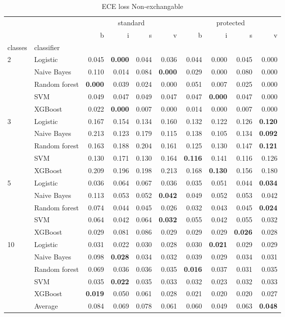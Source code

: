 \begin{table}
\caption{ECE loss Non-exchangable}
\begin{tabular}{l|l|rrrr|rrrr}
\toprule
 &  & \multicolumn{4}{c}{standard} & \multicolumn{4}{c}{protected} \\
 &  & b & i & s & v & b & i & s & v \\
classes & classifier &  &  &  &  &  &  &  &  \\
\midrule
\midrule
\multirow[c]{5}{*}{2} & Logistic & 0.045 & \textbf{0.000} & 0.044 & 0.036 & 0.044 & 0.000 & 0.045 & 0.000 \\
 & Naive Bayes & 0.110 & 0.014 & 0.084 & \textbf{0.000} & 0.029 & 0.000 & 0.080 & 0.000 \\
 & Random forest & \textbf{0.000} & 0.039 & 0.024 & 0.000 & 0.051 & 0.007 & 0.025 & 0.000 \\
 & SVM & 0.049 & 0.047 & 0.049 & 0.047 & 0.047 & \textbf{0.000} & 0.047 & 0.000 \\
 & XGBoost & 0.022 & \textbf{0.000} & 0.007 & 0.000 & 0.014 & 0.000 & 0.007 & 0.000 \\
\midrule
\multirow[c]{5}{*}{3} & Logistic & 0.167 & 0.154 & 0.134 & 0.160 & 0.132 & 0.122 & 0.126 & \textbf{0.120} \\
 & Naive Bayes & 0.213 & 0.123 & 0.179 & 0.115 & 0.138 & 0.105 & 0.134 & \textbf{0.092} \\
 & Random forest & 0.163 & 0.188 & 0.204 & 0.161 & 0.125 & 0.130 & 0.147 & \textbf{0.121} \\
 & SVM & 0.130 & 0.171 & 0.130 & 0.164 & \textbf{0.116} & 0.141 & 0.116 & 0.126 \\
 & XGBoost & 0.209 & 0.196 & 0.198 & 0.213 & 0.168 & \textbf{0.130} & 0.156 & 0.180 \\
\midrule
\multirow[c]{5}{*}{5} & Logistic & 0.036 & 0.064 & 0.067 & 0.036 & 0.035 & 0.051 & 0.044 & \textbf{0.034} \\
 & Naive Bayes & 0.113 & 0.053 & 0.052 & \textbf{0.042} & 0.049 & 0.052 & 0.053 & 0.042 \\
 & Random forest & 0.074 & 0.044 & 0.045 & 0.026 & 0.032 & 0.043 & 0.045 & \textbf{0.024} \\
 & SVM & 0.064 & 0.042 & 0.064 & \textbf{0.032} & 0.055 & 0.042 & 0.055 & 0.032 \\
 & XGBoost & 0.029 & 0.081 & 0.086 & 0.029 & 0.029 & 0.029 & \textbf{0.026} & 0.028 \\
\midrule
\multirow[c]{5}{*}{10} & Logistic & 0.031 & 0.022 & 0.030 & 0.028 & 0.030 & \textbf{0.021} & 0.029 & 0.029 \\
 & Naive Bayes & 0.098 & \textbf{0.028} & 0.034 & 0.032 & 0.039 & 0.029 & 0.034 & 0.031 \\
 & Random forest & 0.069 & 0.036 & 0.036 & 0.035 & \textbf{0.016} & 0.037 & 0.031 & 0.035 \\
 & SVM & 0.035 & \textbf{0.022} & 0.035 & 0.033 & 0.032 & 0.023 & 0.032 & 0.033 \\
 & XGBoost & \textbf{0.019} & 0.050 & 0.061 & 0.028 & 0.021 & 0.020 & 0.020 & 0.027 \\\midrule\ & Average & 0.084 & 0.069 & 0.078 & 0.061 & 0.060 & 0.049 & 0.063 & \textbf{0.048} \\
\bottomrule
\end{tabular}
\end{table}
